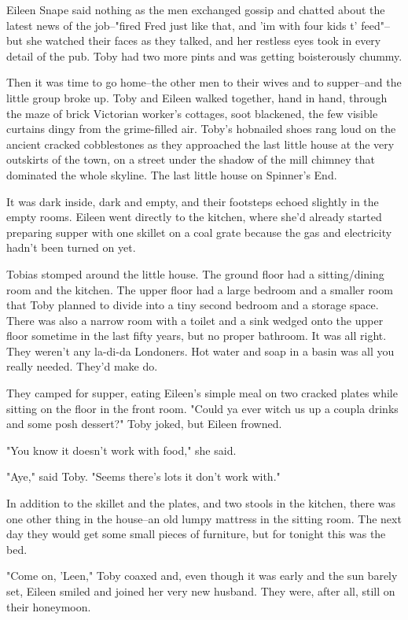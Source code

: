 Eileen Snape said nothing as the men exchanged gossip and chatted about the latest news of the job–"fired Fred just like that, and 'im with four kids t' feed"–but she watched their faces as they talked, and her restless eyes took in every detail of the pub. Toby had two more pints and was getting boisterously chummy.

Then it was time to go home–the other men to their wives and to supper–and the little group broke up. Toby and Eileen walked together, hand in hand, through the maze of brick Victorian worker's cottages, soot blackened, the few visible curtains dingy from the grime-filled air. Toby's hobnailed shoes rang loud on the ancient cracked cobblestones as they approached the last little house at the very outskirts of the town, on a street under the shadow of the mill chimney that dominated the whole skyline. The last little house on Spinner's End.

It was dark inside, dark and empty, and their footsteps echoed slightly in the empty rooms. Eileen went directly to the kitchen, where she'd already started preparing supper with one skillet on a coal grate because the gas and electricity hadn't been turned on yet.

Tobias stomped around the little house. The ground floor had a sitting\slash dining room and the kitchen. The upper floor had a large bedroom and a smaller room that Toby planned to divide into a tiny second bedroom and a storage space. There was also a narrow room with a toilet and a sink wedged onto the upper floor sometime in the last fifty years, but no proper bathroom. It was all right. They weren't any la-di-da Londoners. Hot water and soap in a basin was all you really needed. They'd make do.

They camped for supper, eating Eileen's simple meal on two cracked plates while sitting on the floor in the front room. "Could ya ever witch us up a coupla drinks and some posh dessert?" Toby joked, but Eileen frowned.

"You know it doesn't work with food," she said.

"Aye," said Toby. "Seems there's lots it don't work with."

In addition to the skillet and the plates, and two stools in the kitchen, there was one other thing in the house–an old lumpy mattress in the sitting room. The next day they would get some small pieces of furniture, but for tonight this was the bed.

"Come on, 'Leen," Toby coaxed and, even though it was early and the sun barely set, Eileen smiled and joined her very new husband. They were, after all, still on their honeymoon.


